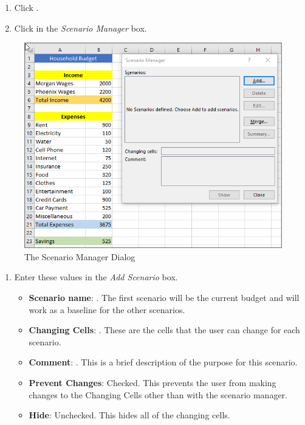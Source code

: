 \begin{enumerate}[resume]
	\item Click .
	\item Click  in the \textit{Scenario Manager} box.
\end{enumerate}

\begin{figure}[H]
	\centering
	\includegraphics[width=\maxwidth{.95\linewidth}]{gfx/ch08_fig50}
	\caption{The Scenario Manager Dialog}
	\label{08:fig50}
\end{figure}

\begin{enumerate}[resume]	
	
	\item Enter these values in the \textit{Add Scenario} box.
	
	\begin{itemize}
		\item \textbf{Scenario name}: . The first scenario will be the current budget and will work as a baseline for the other scenarios.
		\item \textbf{Changing Cells}: . These are the cells that the user can change for each scenario.
		\item \textbf{Comment}: . This is a brief description of the purpose for this scenario.
		\item \textbf{Prevent Changes}: Checked. This prevents the user from making changes to the Changing Cells other than with the scenario manager.
		\item \textbf{Hide}: Unchecked. This hides all of the changing cells.
	\end{itemize}

\end{enumerate}


